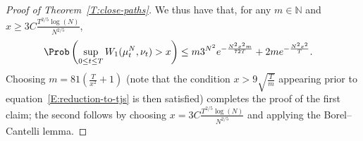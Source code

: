 \begin{proof}[Proof of Theorem~\ref{T:close-paths}]
We thus have that, for any $m\in\mathbb{N}$ and $x\ge 3C\frac{T^{2/5}\log(N)}{N^{2/5}}$,
\begin{align*}
\Prob\left(\sup_{0\le t\le
T}W_1(\mu^N_t,\nu_t)>x\right)&
\le m3^{N^2}e^{-\frac{N^2x^2m}{72T}}+2me^{-\frac{N^2x^2}{T}}.
\end{align*}
Choosing $m=81\left(\frac{T}{x^2}+1\right)$ (note that the condition $x>9\sqrt{\frac{T}{m}}$ appearing prior to equation~\ref{E:reduction-to-tjs} is then satisfied) completes the proof of the first claim; the second follows by choosing $x=3C\frac{T^{2/5}\log(N)}{N^{2/5}}$ and applying the Borel--Cantelli lemma.
\end{proof}



